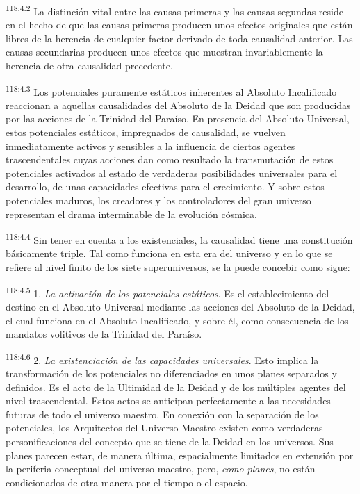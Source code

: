 \par
\textsuperscript{118:4.2} La distinción vital entre las causas primeras y las causas segundas reside en el hecho de que las causas primeras producen unos efectos originales que están libres de la herencia de cualquier factor derivado de toda causalidad anterior. Las causas secundarias producen unos efectos que muestran invariablemente la herencia de otra causalidad precedente.

\par
\textsuperscript{118:4.3} Los potenciales puramente estáticos inherentes al Absoluto Incalificado reaccionan a aquellas causalidades del Absoluto de la Deidad que son producidas por las acciones de la Trinidad del Paraíso. En presencia del Absoluto Universal, estos potenciales estáticos, impregnados de causalidad, se vuelven inmediatamente activos y sensibles a la influencia de ciertos agentes trascendentales cuyas acciones dan como resultado la transmutación de estos potenciales activados al estado de verdaderas posibilidades universales para el desarrollo, de unas capacidades efectivas para el crecimiento. Y sobre estos potenciales maduros, los creadores y los controladores del gran universo representan el drama interminable de la evolución cósmica.

\par
\textsuperscript{118:4.4} Sin tener en cuenta a los existenciales, la causalidad tiene una constitución básicamente triple. Tal como funciona en esta era del universo y en lo que se refiere al nivel finito de los siete superuniversos, se la puede concebir como sigue:

\par
\textsuperscript{118:4.5} 1. \textit{La activación de los potenciales estáticos}. Es el establecimiento del destino en el Absoluto Universal mediante las acciones del Absoluto de la Deidad, el cual funciona en el Absoluto Incalificado, y sobre él, como consecuencia de los mandatos volitivos de la Trinidad del Paraíso.

\par
\textsuperscript{118:4.6} 2. \textit{La existenciación de las capacidades universales}. Esto implica la transformación de los potenciales no diferenciados en unos planes separados y definidos. Es el acto de la Ultimidad de la Deidad y de los múltiples agentes del nivel trascendental. Estos actos se anticipan perfectamente a las necesidades futuras de todo el universo maestro. En conexión con la separación de los potenciales, los Arquitectos del Universo Maestro existen como verdaderas personificaciones del concepto que se tiene de la Deidad en los universos. Sus planes parecen estar, de manera última, espacialmente limitados en extensión por la periferia conceptual del universo maestro, pero, \textit{como planes}, no están condicionados de otra manera por el tiempo o el espacio.

